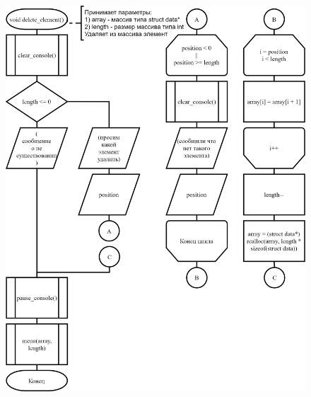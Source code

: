 \begin{figure}[!htp]
    \includegraphics{../src/menu/delete_element/delete_element.png}
\end{figure}

